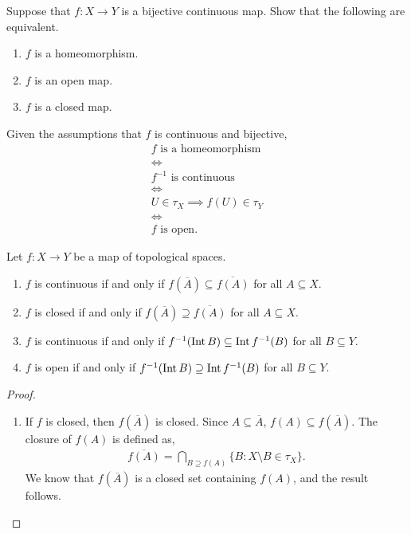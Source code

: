 \begin{exercise}
	\begin{problem}
	Suppose that $ f:X \to Y $ is a bijective continuous map. Show that the following are equivalent.
	\begin{enumerate}
		\item $ f $ is a homeomorphism.
		\item $ f $ is an open map.
		\item $ f $ is a closed map.
	\end{enumerate}
	\end{problem}
	\begin{solution}
		Given the assumptions that $ f $ is continuous and bijective,
		\begin{gather*}
			f \text{ is a homeomorphism}                 \\
			\iff                                         \\
			f ^{-1} \text{ is continuous}                \\
			\iff                                         \\
			U \in \tau_{X} \implies f ( U ) \in \tau_{Y} \\
			\iff                                         \\
			f \text{ is open}.
		\end{gather*}
	\end{solution}
\end{exercise}

\begin{proposition}
	Let $ f:X \to Y $ be a map of topological spaces.
	\begin{enumerate}
		\item $ f $ is continuous if and only if $ f ( \overline{A} ) \subseteq \overline{f ( A )} $ for all $ A \subseteq X $.
		\item $ f $ is closed if and only if $ f ( \overline{A} )\supseteq \overline{f ( A )} $ for all $ A \subseteq X $.
		\item $ f $ is continuous if and only if $ f ^{-1}( \operatorname{Int}{B} )\subseteq \operatorname{Int}{f ^{-1}( B )} $ for all $ B \subseteq Y $.
		\item $ f $ is open if and only if $ f ^{-1}( \operatorname{Int}{B} )\supseteq \operatorname{Int}{f ^{-1}( B )} $ for all $ B \subseteq Y $.
	\end{enumerate}
	\begin{proof}
		\begin{enumerate}
			\item If $ f $ is closed, then $ f ( \overline{A} ) $ is closed. Since $ A \subseteq \overline{A} $, $ f ( A )\subseteq f ( \overline{A} ) $. The closure of $ f ( A ) $ is defined as,
			      \begin{align*}
				      \overline{f ( A )} = \bigcap_{B \supseteq f ( A )}{\{ B: X \setminus B \in \tau_{X} \}}.
			      \end{align*}
			      We know that $ f ( \overline{A} ) $ is a closed set containing $ f ( A ) $, and the result follows.
		\end{enumerate}
	\end{proof}
\end{proposition}

